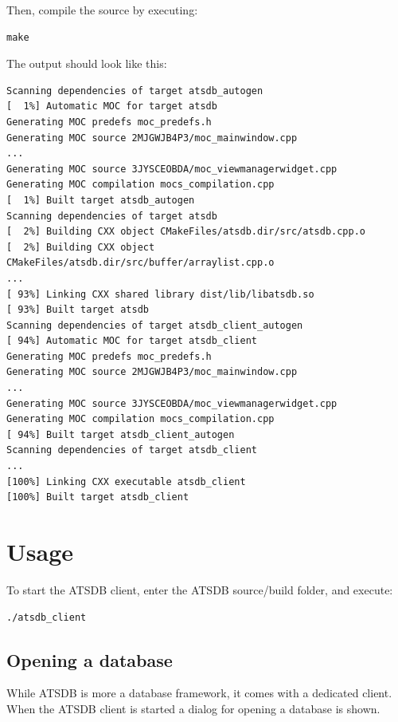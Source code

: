 \documentclass[10pt,letterpaper,extrafontsizes]{memoir}
\begin{document}
Then, compile the source by executing:

\begin{verbatim}
make
\end{verbatim}

The output should look like this:

\begin{verbatim}
Scanning dependencies of target atsdb_autogen
[  1%] Automatic MOC for target atsdb
Generating MOC predefs moc_predefs.h
Generating MOC source 2MJGWJB4P3/moc_mainwindow.cpp
...
Generating MOC source 3JYSCEOBDA/moc_viewmanagerwidget.cpp
Generating MOC compilation mocs_compilation.cpp
[  1%] Built target atsdb_autogen
Scanning dependencies of target atsdb
[  2%] Building CXX object CMakeFiles/atsdb.dir/src/atsdb.cpp.o
[  2%] Building CXX object CMakeFiles/atsdb.dir/src/buffer/arraylist.cpp.o
...
[ 93%] Linking CXX shared library dist/lib/libatsdb.so
[ 93%] Built target atsdb
Scanning dependencies of target atsdb_client_autogen
[ 94%] Automatic MOC for target atsdb_client
Generating MOC predefs moc_predefs.h
Generating MOC source 2MJGWJB4P3/moc_mainwindow.cpp
...
Generating MOC source 3JYSCEOBDA/moc_viewmanagerwidget.cpp
Generating MOC compilation mocs_compilation.cpp
[ 94%] Built target atsdb_client_autogen
Scanning dependencies of target atsdb_client
...
[100%] Linking CXX executable atsdb_client
[100%] Built target atsdb_client
\end{verbatim}

\chapter{Usage}
\label{sec:usage}

To start the ATSDB client, enter the ATSDB source/build folder, and execute:

\begin{verbatim}
./atsdb_client
\end{verbatim}

\section{Opening a database}
\label{sec:startup}

While ATSDB is more a database framework, it comes with a dedicated client. When the ATSDB client is started a dialog  for opening a database is shown. 
\end{document}
